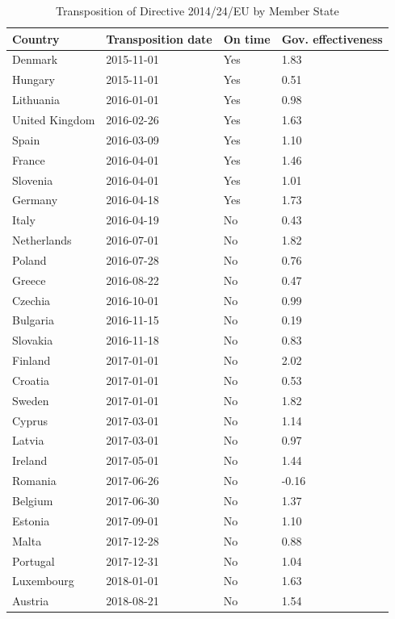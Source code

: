 \begin{table}[ht]
\centering
\begin{tabular}{llll}
  \hline
Country & Transposition date & On time & Gov. effectiveness \\ 
  \hline
Denmark & 2015-11-01 & Yes & 1.83 \\ 
  Hungary & 2015-11-01 & Yes & 0.51 \\ 
  Lithuania & 2016-01-01 & Yes & 0.98 \\ 
  United Kingdom & 2016-02-26 & Yes & 1.63 \\ 
  Spain & 2016-03-09 & Yes & 1.10 \\ 
  France & 2016-04-01 & Yes & 1.46 \\ 
  Slovenia & 2016-04-01 & Yes & 1.01 \\ 
  Germany & 2016-04-18 & Yes & 1.73 \\ 
  Italy & 2016-04-19 & No & 0.43 \\ 
  Netherlands & 2016-07-01 & No & 1.82 \\ 
  Poland & 2016-07-28 & No & 0.76 \\ 
  Greece & 2016-08-22 & No & 0.47 \\ 
  Czechia & 2016-10-01 & No & 0.99 \\ 
  Bulgaria & 2016-11-15 & No & 0.19 \\ 
  Slovakia & 2016-11-18 & No & 0.83 \\ 
  Finland & 2017-01-01 & No & 2.02 \\ 
  Croatia & 2017-01-01 & No & 0.53 \\ 
  Sweden & 2017-01-01 & No & 1.82 \\ 
  Cyprus & 2017-03-01 & No & 1.14 \\ 
  Latvia & 2017-03-01 & No & 0.97 \\ 
  Ireland & 2017-05-01 & No & 1.44 \\ 
  Romania & 2017-06-26 & No & -0.16 \\ 
  Belgium & 2017-06-30 & No & 1.37 \\ 
  Estonia & 2017-09-01 & No & 1.10 \\ 
  Malta & 2017-12-28 & No & 0.88 \\ 
  Portugal & 2017-12-31 & No & 1.04 \\ 
  Luxembourg & 2018-01-01 & No & 1.63 \\ 
  Austria & 2018-08-21 & No & 1.54 \\ 
   \hline
\end{tabular}
\caption{Transposition of Directive 2014/24/EU by Member State} 
\label{tab:transposition}
\end{table}
